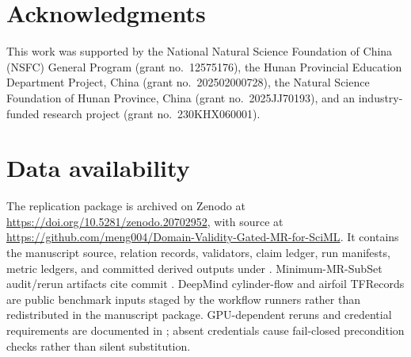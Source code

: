 \documentclass[preprint,12pt]{elsarticle}
\let\paperbibliography
\renewcommand{}[1]{{\footnotesize\paperbibliography{#1}}}
\begin{document}
\section*{Acknowledgments}
This work was supported by the National Natural Science Foundation of China (NSFC) General Program (grant no.\ 12575176), the Hunan Provincial Education Department Project, China (grant no.\ 202502000728), the Natural Science Foundation of Hunan Province, China (grant no.\ 2025JJ70193), and an industry-funded research project (grant no.\ 230KHX060001).

\section*{Data availability}
The replication package is archived on Zenodo at \url{https://doi.org/10.5281/zenodo.20702952}, with source at \url{https://github.com/meng004/Domain-Validity-Gated-MR-for-SciML}. It contains the manuscript source, relation records, validators, claim ledger, run manifests, metric ledgers, and committed derived outputs under . Minimum-MR-SubSet audit/rerun artifacts cite commit . DeepMind cylinder-flow and airfoil TFRecords are public benchmark inputs staged by the workflow runners rather than redistributed in the manuscript package. GPU-dependent reruns and credential requirements are documented in ; absent credentials cause fail-closed precondition checks rather than silent substitution.



\end{document}

